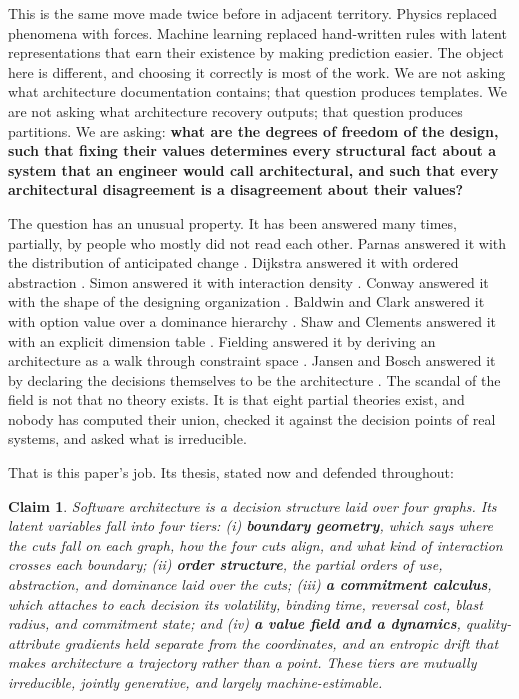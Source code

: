 \documentclass[11pt,oneside]{article}
\newtheorem{claim}{Claim}
\theoremstyle{definition}
\begin{document}
This is the same move made twice before in adjacent territory. Physics replaced phenomena with
forces. Machine learning replaced hand-written rules with latent representations that earn their
existence by making prediction easier. The object here is different, and choosing it correctly
is most of the work. We are not asking what architecture documentation contains; that question
produces templates. We are not asking what architecture recovery outputs; that question produces
partitions. We are asking: \textbf{what are the degrees of freedom of the design, such that
fixing their values determines every structural fact about a system that an engineer would call
architectural, and such that every architectural disagreement is a disagreement about their
values?}

The question has an unusual property. It has been answered many times, partially, by people who
mostly did not read each other. Parnas answered it with the distribution of anticipated change
\cite{parnas1972}. Dijkstra answered it with ordered abstraction \cite{dijkstra1968}. Simon
answered it with interaction density \cite{simon1962}. Conway answered it with the shape of the
designing organization \cite{conway1968}. Baldwin and Clark answered it with option value over a
dominance hierarchy \cite{baldwinclark2000}. Shaw and Clements answered it with an explicit
dimension table \cite{boxology1997}. Fielding answered it by deriving an architecture as a walk
through constraint space \cite{fielding2000}. Jansen and Bosch answered it by declaring the
decisions themselves to be the architecture \cite{jansenbosch2005}. The scandal of the field is
not that no theory exists. It is that eight partial theories exist, and nobody has computed
their union, checked it against the decision points of real systems, and asked what is
irreducible.

That is this paper's job. Its thesis, stated now and defended throughout:

\begin{claim}\label{claim:main}
Software architecture is a decision structure laid over four graphs. Its latent variables fall
into four tiers: (i) \textbf{boundary geometry}, which says where the cuts fall on each graph,
how the four cuts align, and what kind of interaction crosses each boundary; (ii) \textbf{order
structure}, the partial orders of use, abstraction, and dominance laid over the cuts; (iii)
\textbf{a commitment calculus}, which attaches to each decision its volatility, binding time,
reversal cost, blast radius, and commitment state; and (iv) \textbf{a value field and a
dynamics}, quality-attribute gradients held separate from the coordinates, and an entropic drift
that makes architecture a trajectory rather than a point. These tiers are mutually irreducible,
jointly generative, and largely machine-estimable.
\end{claim}
\end{document}
